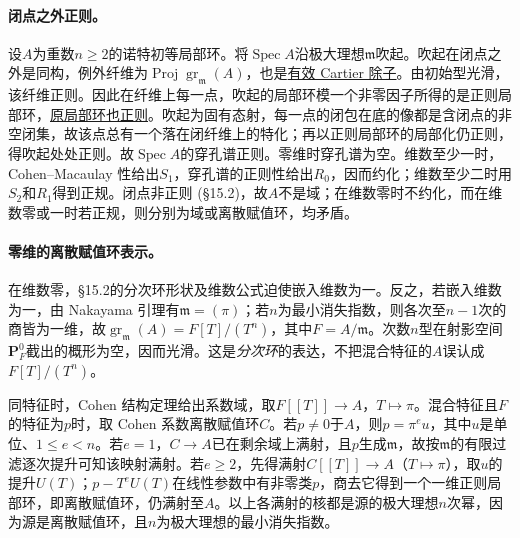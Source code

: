 \documentclass[openany,fontset=fandol]{ctexbook}
\newcommand{\m}{\mathfrak m}
\DeclareMathOperator{\gr}{gr}
\DeclareMathOperator{\Spec}{Spec}
\DeclareMathOperator{\Proj}{Proj}
\begin{document}
\paragraph{闭点之外正则。}
设$A$为重数$n\ge2$的诺特初等局部环。将$\Spec A$沿极大理想$\m$吹起。吹起在闭点之外是同构，例外纤维为$\Proj\gr_\m(A)$，也是\href{https://stacks.math.columbia.edu/tag/01OF}{有效 Cartier 除子}。由初始型光滑，该纤维正则。因此在纤维上每一点，吹起的局部环模一个非零因子所得的是正则局部环，\href{https://stacks.math.columbia.edu/tag/00NU}{原局部环也正则}。吹起为固有态射，每一点的闭包在底的像都是含闭点的非空闭集，故该点总有一个落在闭纤维上的特化；再以正则局部环的局部化仍正则，得吹起处处正则。故$\Spec A$的穿孔谱正则。零维时穿孔谱为空。维数至少一时，Cohen--Macaulay 性给出$S_1$，穿孔谱的正则性给出$R_0$，因而约化；维数至少二时用$S_2$和$R_1$得到正规。闭点非正则 (§15.2)，故$A$不是域；在维数零时不约化，而在维数零或一时若正规，则分别为域或离散赋值环，均矛盾。

\paragraph{零维的离散赋值环表示。}
在维数零，§15.2的分次环形状及维数公式迫使嵌入维数为一。反之，若嵌入维数为一，由 Nakayama 引理有$\m=(\pi)$；若$n$为最小消失指数，则各次至$n-1$次的商皆为一维，故$\gr_\m(A)=F[T]/(T^n)$，其中$F=A/\m$。次数$n$型在射影空间$\mathbf P^0_F$截出的概形为空，因而光滑。这是\emph{分次环}的表达，不把混合特征的$A$误认成$F[T]/(T^n)$。

同特征时，Cohen 结构定理给出系数域，取$F[[T]]\to A$，$T\mapsto\pi$。混合特征且$F$的特征为$p$时，取 Cohen 系数离散赋值环$C$。若$p\ne0$于$A$，则$p=\pi^eu$，其中$u$是单位、$1\le e<n$。若$e=1$，$C\to A$已在剩余域上满射，且$p$生成$\m$，故按$\m$的有限过滤逐次提升可知该映射满射。若$e\ge2$，先得满射$C[[T]]\to A$（$T\mapsto\pi$），取$u$的提升$U(T)$；$p-T^eU(T)$在线性参数中有非零类$p$，商去它得到一个一维正则局部环，即离散赋值环，仍满射至$A$。以上各满射的核都是源的极大理想$n$次幂，因为源是离散赋值环，且$n$为极大理想的最小消失指数。
\end{document}
